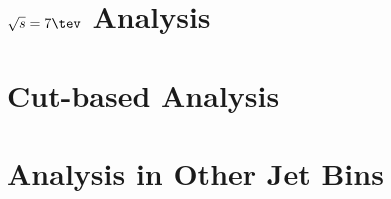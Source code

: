 \section{$\sqrts=7 \tev$ Analysis}
\label{chap:analysis:sec:reanalysis}


\section{Cut-based Analysis}
\label{chap:analysis:sec:cutbased}


\section{\hwwlnln Analysis in Other Jet Bins}
\label{chap:analysis:sec:zero_one_jet}




